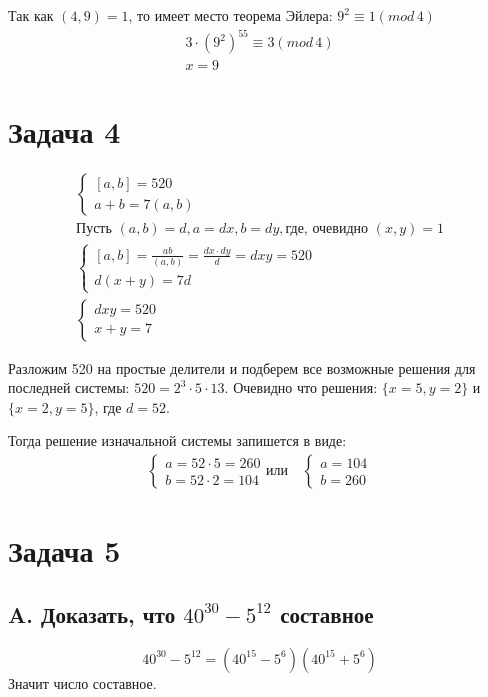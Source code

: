 \documentclass[a4paper,12pt]{article}
\begin{document}
    Так как $(4, 9) = 1 $, то имеет место теорема Эйлера: $9^2 \equiv 1(mod\, 4)$
\begin{gather*}
    3\cdot (9^2)^{55} \equiv 3 (mod\, 4) \\
    x = 9
\end{gather*}

\section*{Задача 4}
\begin{gather*}
    \begin{cases}
        [a,b] = 520 \\
        a+b = 7 (a,b)
    \end{cases} \\
    \text{Пусть } (a,b) = d, a = dx, b = dy,\text{где, очевидно }(x,y)=1 \\
    \begin{cases}
        [a,b]=\frac{ab}{(a,b)}=\frac{dx\cdot dy}{d}=dxy = 520 \\
        d(x+y)=7d
    \end{cases} \\
    \begin{cases}
        dxy = 520 \\
        x+y = 7
    \end{cases}
\end{gather*}

Разложим 520 на простые делители и подберем все возможные решения для последней системы: $520 = 2^3 \cdot 5 \cdot 13 $. Очевидно что решения: $\{ x=5, y=2 \}$ и $\{ x=2, y=5 \}$, где $d=52$.

Тогда решение изначальной системы запишется в виде:
\begin{gather*}
    \begin{cases}
        a = 52\cdot 5 = 260\\
        b = 52\cdot 2 = 104
    \end{cases}
    \text{или}\quad
    \begin{cases}
        a = 104 \\
        b = 260
    \end{cases}
\end{gather*}

\section*{Задача 5}
\subsection*{A. Доказать, что $ 40^{30} - 5^{12} $ составное}
$$ 40^{30} - 5^{12} = (40^{15} - 5^{6})(40^{15}+5^{6}) $$
Значит число составное.
\end{document}
